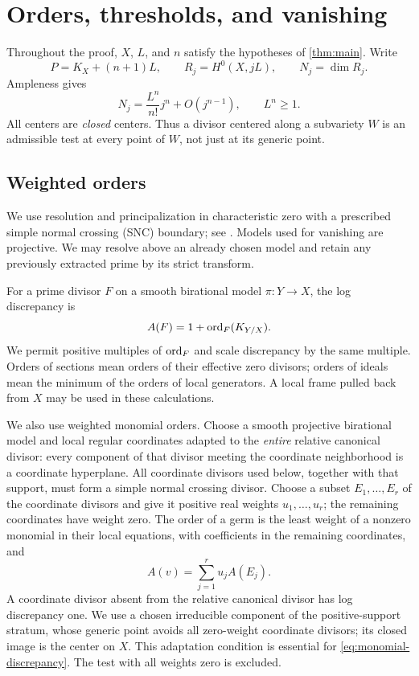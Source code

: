 \section{Orders, thresholds, and vanishing}\label{sec:preliminaries}
Throughout the proof, $X$, $L$, and $n$ satisfy the hypotheses of \cref{thm:main}. Write
\[
 P=K_X+(n+1)L,\qquad R_j=H^0(X,jL),\qquad N_j=\dim R_j.
\]
Ampleness gives
\begin{equation}\label{eq:hilbert-X}
 N_j=\frac{L^n}{n!}j^n+O(j^{n-1}),\qquad L^n\geq1.
\end{equation}
All centers are \emph{closed} centers. Thus a divisor centered along a subvariety $W$ is an admissible test at every point of $W$, not just at its generic point.

\subsection{Weighted orders}
We use resolution and principalization in characteristic zero with a prescribed simple normal crossing (SNC) boundary; see \cite[Theorems~1.0.1 and~2.4.1]{wlodarczyk2005}. Models used for vanishing are projective. We may resolve above an already chosen model and retain any previously extracted prime by its strict transform.

For a prime divisor $F$ on a smooth birational model $\pi:Y\to X$, the log discrepancy is
\[
 {A}(F)=1+\operatorname{ord}_F(K_{Y/X}).
\]
We permit positive multiples of $\operatorname{ord}_F$ and scale discrepancy by the same multiple. Orders of sections mean orders of their effective zero divisors; orders of ideals mean the minimum of the orders of local generators. A local frame pulled back from $X$ may be used in these calculations.

We also use weighted monomial orders. Choose a smooth projective birational model and local regular coordinates adapted to the \emph{entire} relative canonical divisor: every component of that divisor meeting the coordinate neighborhood is a coordinate hyperplane. All coordinate divisors used below, together with that support, must form a simple normal crossing divisor. Choose a subset $E_1,\ldots,E_r$ of the coordinate divisors and give it positive real weights $u_1,\ldots,u_r$; the remaining coordinates have weight zero. The order of a germ is the least weight of a nonzero monomial in their local equations, with coefficients in the remaining coordinates, and
\begin{equation}\label{eq:monomial-discrepancy}
             {A}(v)=\sum_{j=1}^r u_j{A}(E_j).
\end{equation}
A coordinate divisor absent from the relative canonical divisor has log discrepancy one. We use a chosen irreducible component of the positive-support stratum, whose generic point avoids all zero-weight coordinate divisors; its closed image is the center on $X$. This adaptation condition is essential for \eqref{eq:monomial-discrepancy}. The test with all weights zero is excluded.

